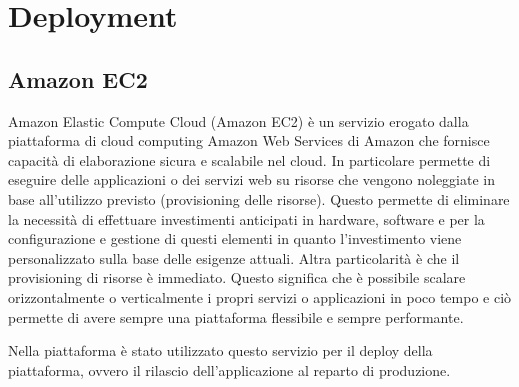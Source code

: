 \section{Deployment}
\subsection{Amazon EC2}
Amazon Elastic Compute Cloud (Amazon EC2) è un servizio erogato dalla piattaforma di cloud computing Amazon Web Services di Amazon che
fornisce capacità di elaborazione sicura e scalabile nel cloud. In particolare permette di eseguire delle applicazioni
o dei servizi web su risorse che vengono noleggiate in base all'utilizzo previsto (provisioning delle risorse).
Questo permette di eliminare la necessità di effettuare investimenti anticipati in hardware, software e per la configurazione
e gestione di questi elementi in quanto l'investimento viene personalizzato sulla base delle esigenze attuali.
Altra particolarità è che il provisioning di risorse è immediato. Questo significa che è possibile scalare orizzontalmente o verticalmente
i propri servizi o applicazioni in poco tempo e ciò permette di avere sempre una piattaforma flessibile e sempre performante.

Nella piattaforma è stato utilizzato questo servizio per il deploy della piattaforma, ovvero il rilascio dell'applicazione al reparto di produzione.

